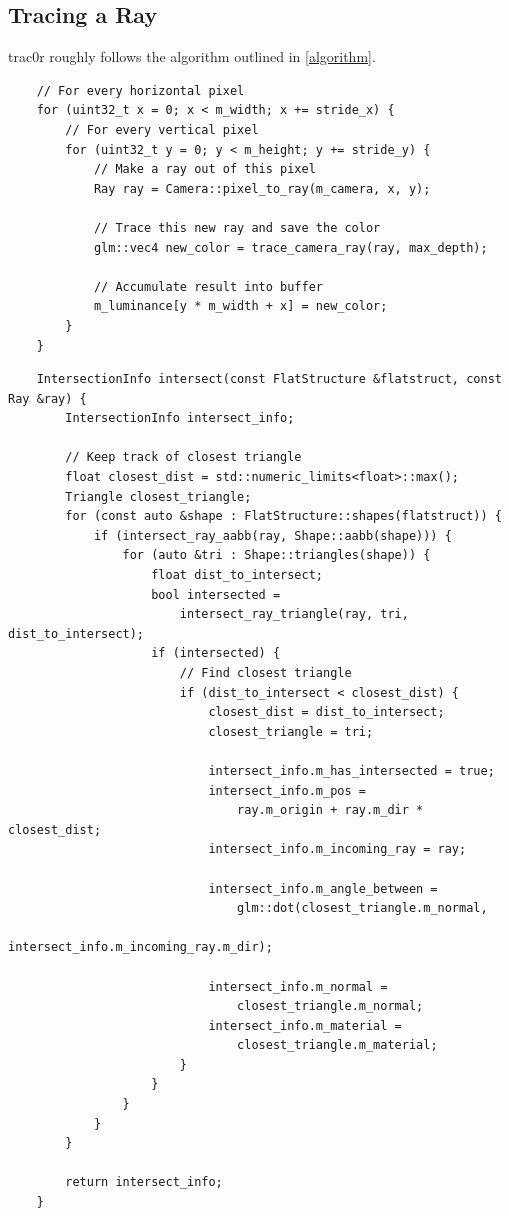 \documentclass[
  twoside,
  11pt, a4paper,
  footinclude=true,
  headinclude=true,
  cleardoublepage=empty
]{scrreprt}
\begin{document}
\subsection{Tracing a Ray}
trac0r roughly follows the algorithm outlined in \ref{algorithm}.

\begin{verbatim}
    // For every horizontal pixel
    for (uint32_t x = 0; x < m_width; x += stride_x) {
        // For every vertical pixel
        for (uint32_t y = 0; y < m_height; y += stride_y) {
            // Make a ray out of this pixel
            Ray ray = Camera::pixel_to_ray(m_camera, x, y);

            // Trace this new ray and save the color
            glm::vec4 new_color = trace_camera_ray(ray, max_depth);

            // Accumulate result into buffer
            m_luminance[y * m_width + x] = new_color;
        }
    }
\end{verbatim} 

\begin{verbatim}
    IntersectionInfo intersect(const FlatStructure &flatstruct, const Ray &ray) {
        IntersectionInfo intersect_info;

        // Keep track of closest triangle
        float closest_dist = std::numeric_limits<float>::max();
        Triangle closest_triangle;
        for (const auto &shape : FlatStructure::shapes(flatstruct)) {
            if (intersect_ray_aabb(ray, Shape::aabb(shape))) {
                for (auto &tri : Shape::triangles(shape)) {
                    float dist_to_intersect;
                    bool intersected = 
                        intersect_ray_triangle(ray, tri, dist_to_intersect);
                    if (intersected) {
                        // Find closest triangle
                        if (dist_to_intersect < closest_dist) {
                            closest_dist = dist_to_intersect;
                            closest_triangle = tri;

                            intersect_info.m_has_intersected = true;
                            intersect_info.m_pos =
                                ray.m_origin + ray.m_dir * closest_dist;
                            intersect_info.m_incoming_ray = ray;

                            intersect_info.m_angle_between =
                                glm::dot(closest_triangle.m_normal,
                                         intersect_info.m_incoming_ray.m_dir);

                            intersect_info.m_normal =
                                closest_triangle.m_normal;
                            intersect_info.m_material =
                                closest_triangle.m_material;
                        }
                    }
                }
            }
        }

        return intersect_info;
    }
\end{verbatim} 
\end{document}
